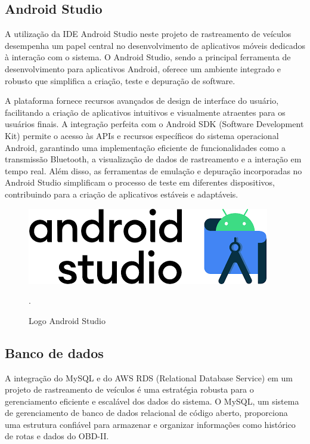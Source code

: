     \subsection{Android Studio} A utilização da IDE Android Studio neste projeto de rastreamento de veículos desempenha um papel central no desenvolvimento de aplicativos móveis dedicados à interação com o sistema. O Android Studio, sendo a principal ferramenta de desenvolvimento para aplicativos Android, oferece um ambiente integrado e robusto que simplifica a criação, teste e depuração de software. 
    
    A plataforma fornece recursos avançados de design de interface do usuário, facilitando a criação de aplicativos intuitivos e visualmente atraentes para os usuários finais. A integração perfeita com o Android SDK (Software Development Kit) permite o acesso às APIs e recursos específicos do sistema operacional Android, garantindo uma implementação eficiente de funcionalidades como a transmissão Bluetooth, a visualização de dados de rastreamento e a interação em tempo real. Além disso, as ferramentas de emulação e depuração incorporadas no Android Studio simplificam o processo de teste em diferentes dispositivos, contribuindo para a criação de aplicativos estáveis e adaptáveis.

     \begin{figure}[hp]
    \centering
    
    \includegraphics[scale=0.4]{figures/logo_android.png}
    
    \caption{Logo Android Studio}.
    
\end{figure}
    
     \subsection{Banco de dados} A integração do MySQL e do AWS RDS (Relational Database Service) em um projeto de rastreamento de veículos é uma estratégia robusta para o gerenciamento eficiente e escalável dos dados do sistema. O MySQL, um sistema de gerenciamento de banco de dados relacional de código aberto, proporciona uma estrutura confiável para armazenar e organizar informações como histórico de rotas e dados do OBD-II. 
     
